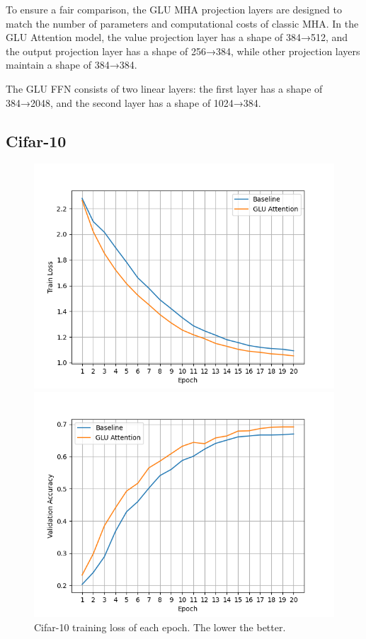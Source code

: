 \documentclass[11pt]{article}
\begin{document}
To ensure a fair comparison, the GLU MHA projection layers are designed to match the number of parameters and computational costs of classic MHA. In the GLU Attention model, the value projection layer has a shape of 384→512, and the output projection layer has a shape of 256→384, while other projection layers maintain a shape of 384→384.

The GLU FFN consists of two linear layers: the first layer has a shape of 384→2048, and the second layer has a shape of 1024→384.

\subsection{Cifar-10}

\begin{figure}[htbp]
    \centering
    \begin{minipage}{0.49\textwidth}
        \centering
        \includegraphics[width=\textwidth]{cifar10_train_loss.png}
        \caption{Cifar-10 training loss of each epoch. The lower the better.}
        \label{fig:cifar10_train_loss}
    \end{minipage}
    \hfill
    \begin{minipage}{0.49\textwidth}
        \centering
        \includegraphics[width=\textwidth]{cifar10_val_acc.png}

\end{minipage}
\end{figure}
\end{document}
